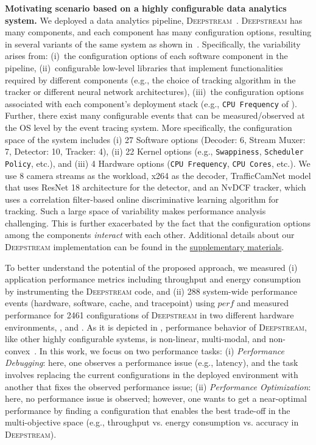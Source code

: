 \noindent
\textbf{Motivating scenario based on a highly configurable data analytics system.} We deployed a data analytics pipeline, \textsc{Deepstream}~\cite{DeepStream}. \textsc{Deepstream} has many components, and each component has many configuration options, resulting in several variants of the same system as shown in~. Specifically, the variability arises from: 
(i)~the configuration options of each software component in the pipeline, (ii)~configurable low-level libraries that implement functionalities required by different components (e.g., the choice of tracking algorithm in the tracker or different neural network architectures), (iii)~the configuration options associated with each component's deployment stack (e.g., \texttt{CPU Frequency} of \xavier).  Further, there exist many configurable events that can be measured/observed at the OS level by the event tracing system. More specifically, the configuration space of the system includes (i) 27 Software options (Decoder: 6, Stream Muxer: 7, Detector: 10, Tracker: 4), (ii) 22 Kernel options (e.g., \texttt{Swappiness}, \texttt{Scheduler Policy}, etc.), and (iii) 4 Hardware options (\texttt{CPU Frequency}, \texttt{CPU Cores}, etc.). We use 8 camera streams as the workload, x264 as the decoder, TrafficCamNet model that uses ResNet 18 architecture for the detector, and an NvDCF tracker, which uses a correlation filter-based online discriminative learning algorithm for tracking. Such a large space of variability makes performance analysis challenging. This is further exacerbated by the fact that the configuration options among the components \emph{interact} with each other. Additional details about our \textsc{Deepstream} implementation can be found in the \href{https://github.com/softsys4ai/unicorn}{\color{blue!80}supplementary materials}.

To better understand the potential of the proposed approach, we measured (i) application performance metrics including throughput and energy consumption by instrumenting the \textsc{Deepstream} code, and (ii) 288 system-wide performance events (hardware, software, cache, and tracepoint) using $perf$ and measured performance for 2461 configurations of \textsc{Deepstream} in two different hardware environments, \xavier, and \txtwo.  As it is depicted in  , performance behavior of \textsc{Deepstream}, like other highly configurable systems, is non-linear, multi-modal, and non-convex~\cite{jamshidi2016uncertainty}. In this work, we focus on two performance tasks: 
(i) \textit{Performance Debugging}: here, one observes a performance issue (e.g., latency), and the task involves replacing the current configurations in the deployed environment with another that fixes the observed performance issue; 
(ii) \textit{Performance Optimization}: here, no performance issue is observed; however, one wants to get a near-optimal performance by finding a configuration that enables the best trade-off in the multi-objective space (e.g., throughput vs. energy consumption vs. accuracy in \textsc{Deepstream}).

